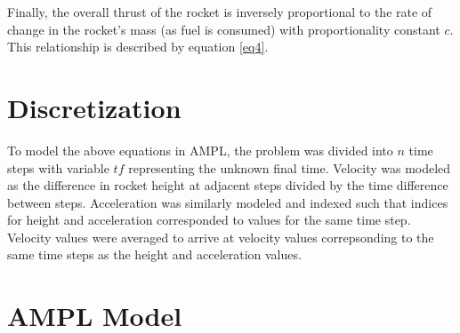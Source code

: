 \documentclass{article}
\begin{document}
Finally, the overall thrust of the rocket is inversely proportional to the rate of change in the rocket's mass (as fuel is consumed) with proportionality constant \(c\). This relationship is described by equation \ref{eq4}.

\section{Discretization}\label{Discretization}

To model the above equations in AMPL, the problem was divided into \(n\) time steps with variable \(tf\) representing the unknown final time. Velocity was modeled as the difference in rocket height at adjacent steps divided by the time difference between steps. Acceleration was similarly modeled and indexed such that indices for height and acceleration corresponded to values for the same time step. Velocity values were averaged to arrive at velocity values correpsonding to the same time steps as the height and acceleration values.

\section{AMPL Model}\label{AMPL Model}
\end{document}
